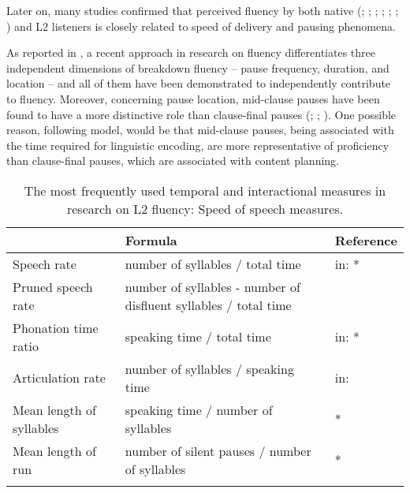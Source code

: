 Later on, many studies confirmed that perceived fluency by both native (\citealt{BoskerEtAl2013}; \citealt{DerwingEtAl2004}; \citealt{KormosDénes2004}; \citealt{PréfontaineKormosJohnson2016}; \citealt{Rossiter2009}; \citealt{SaitoEtAl2018}; \citealt{SuzukiKormos2020}) and L2 listeners \citep{MagneEtAl2019} is closely related to speed of delivery and pausing phenomena.

As reported in \citet{SuzukiKormos2020}, a recent approach in research on fluency differentiates three independent dimensions of breakdown fluency – pause frequency, duration, and location – and all of them have been demonstrated to independently contribute to fluency. Moreover, concerning pause location, mid-clause pauses have been found to have a more distinctive role than clause-final pauses (\citealt{MagneEtAl2019}; \citealt{SaitoEtAl2018}; \citealt{SuzukiKormos2020}). One possible reason, following  model, would be that mid-clause pauses, being associated with the time required for linguistic encoding, are more representative of proficiency than clause-final pauses, which are associated with content planning.


\begin{table}[p]
\caption{\label{tab:3.1a}The most frequently used temporal and interactional measures in research on L2 fluency: Speed of speech measures.}
\footnotesize
\begin{tabularx}{\textwidth}{lQl@{}}
\lsptoprule
{} & Formula & {Reference}\\
\midrule
Speech rate & number of syllables / total time & \citet{Kormos2006} in: \citet{DeJong2016}*\\
Pruned speech rate & number of syllables - number of disfluent syllables / total time & \citet{DeJong2016}\\
Phonation time ratio & speaking time / total time & \citet{Kormos2006} in: \citet{DeJong2016}*\\
Articulation rate & number of syllables / speaking time & \citet{Kormos2006} in: \citet{DeJong2016}\\
Mean length of syllables & speaking time / number of syllables & \citet{DeJong2016}*\\
Mean length of run & number of silent pauses / number of syllables & \citet{Kormos2006}*\\
\lspbottomrule
\end{tabularx}
\end{table}

